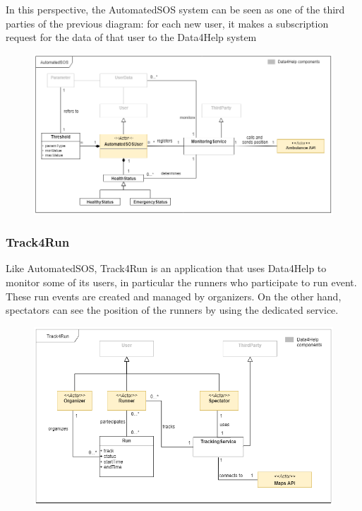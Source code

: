 In this perspective, the AutomatedSOS system can be seen as one of the third parties of the previous diagram: for each new user, it makes a subscription request for the data of that user to the Data4Help system

\begin{figure}[h!]
	\centering
	\includegraphics[width = \linewidth] {../Diagrams/ClassDiagram-AutomatedSOS.png}\\[1.0 cm]
\end{figure}

\newpage
\subsubsection{Track4Run}
Like AutomatedSOS, Track4Run is an application that uses Data4Help to monitor some of its users, in particular the runners who participate to run event.
These run events are created and managed by organizers. On the other hand, spectators can see the position of the runners by using the dedicated service.

\begin{figure}[h!]
	\centering
	\includegraphics[width = \linewidth] {../Diagrams/ClassDiagram-Track4Run.png}\\[1.0 cm]
\end{figure}
	
